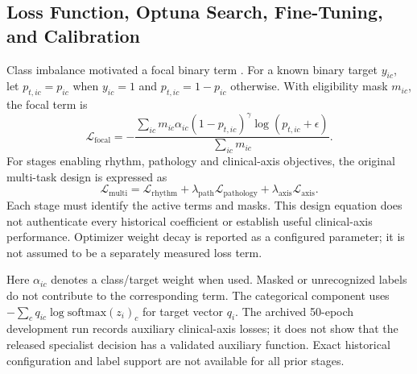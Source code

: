 \documentclass[life,article,submit,moreauthors]{Definitions/mdpi}
\begin{document}


\subsection{Loss Function, Optuna Search, Fine-Tuning, and Calibration}


\label{sec:optimization}
Class imbalance motivated a focal binary term \citep{Lin2017Focal}. For a known binary target $y_{ic}$, let $p_{t,ic}=p_{ic}$ when $y_{ic}=1$ and $p_{t,ic}=1-p_{ic}$ otherwise. With eligibility mask $m_{ic}$, the focal term is
\begin{equation}
\mathcal L_{\mathrm{focal}}=-\frac{\sum_{ic}m_{ic}\alpha_{ic}(1-p_{t,ic})^\gamma\log(p_{t,ic}+\epsilon)}{\sum_{ic}m_{ic}}.
\end{equation}
For stages enabling rhythm, pathology and clinical-axis objectives, the original multi-task design is expressed as
\begin{equation}
\mathcal L_{\mathrm{multi}}=\mathcal L_{\mathrm{rhythm}}+\lambda_{\mathrm{path}}\mathcal L_{\mathrm{pathology}}+\lambda_{\mathrm{axis}}\mathcal L_{\mathrm{axis}}.
\end{equation}
Each stage must identify the active terms and masks. This design equation does not authenticate every historical coefficient or establish useful clinical-axis performance. Optimizer weight decay is reported as a configured parameter; it is not assumed to be a separately measured loss term.

Here $\alpha_{ic}$ denotes a class/target weight when used. Masked or unrecognized labels do not contribute to the corresponding term. The categorical component uses $-\sum_c q_{ic}\log \mathrm{softmax}(z_i)_c$ for target vector $q_i$. The archived 50-epoch development run records auxiliary clinical-axis losses; it does not show that the released specialist decision has a validated auxiliary function. Exact historical configuration and label support are not available for all prior stages.
\end{document}
